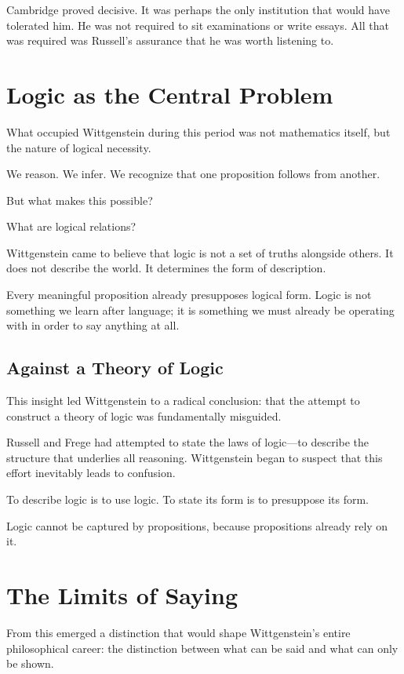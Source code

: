 \documentclass[11pt]{article}
\begin{document}
Cambridge proved decisive. It was perhaps the only institution that would have tolerated him. He was not required to sit examinations or write essays. All that was required was Russell’s assurance that he was worth listening to.

\section*{Logic as the Central Problem}

What occupied Wittgenstein during this period was not mathematics itself, but the nature of logical necessity.

We reason.  
We infer.  
We recognize that one proposition follows from another.

But what makes this possible?

What are logical relations?

Wittgenstein came to believe that logic is not a set of truths alongside others. It does not describe the world. It determines the form of description.

Every meaningful proposition already presupposes logical form. Logic is not something we learn after language; it is something we must already be operating with in order to say anything at all.

\subsection*{Against a Theory of Logic}

This insight led Wittgenstein to a radical conclusion: that the attempt to construct a theory of logic was fundamentally misguided.

Russell and Frege had attempted to state the laws of logic—to describe the structure that underlies all reasoning. Wittgenstein began to suspect that this effort inevitably leads to confusion.

To describe logic is to use logic.  
To state its form is to presuppose its form.

Logic cannot be captured by propositions, because propositions already rely on it.

\section*{The Limits of Saying}

From this emerged a distinction that would shape Wittgenstein’s entire philosophical career: the distinction between what can be said and what can only be shown.
\end{document}
